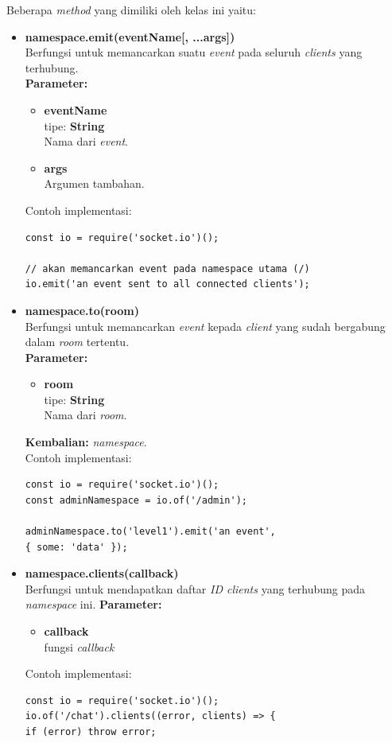 \documentclass[a4paper,twoside]{article}
\begin{document}
\begin{enumerate}
\begin{enumerate}
\begin{enumerate}
				Beberapa \textit{method} yang dimiliki oleh kelas ini yaitu:
				\begin{itemize}
					\item \textbf{namespace.emit(eventName[, ...args])} \\
					Berfungsi untuk memancarkan suatu \textit{event} pada seluruh \textit{clients} yang terhubung. \\
					\textbf{Parameter:}
					\begin{itemize}
						\item \textbf{eventName} \\tipe: \textbf{String} \\ Nama dari \textit{event}.
						\item \textbf{args} \\ Argumen tambahan.
					\end{itemize}
					Contoh implementasi:
\begin{lstlisting}
const io = require('socket.io')();
					
// akan memancarkan event pada namespace utama (/)
io.emit('an event sent to all connected clients'); 
					\end{lstlisting}
					
					\item \textbf{namespace.to(room)} \\ 
					Berfungsi untuk memancarkan \textit{event} kepada \textit{client} yang sudah bergabung dalam \textit{room} tertentu. \\ 
					\textbf{Parameter:}
					\begin{itemize}
						\item \textbf{room} \\tipe: \textbf{String} \\ Nama dari \textit{room}.
					\end{itemize}
					\textbf{Kembalian:} \textit{namespace}. \\
					Contoh implementasi:
\begin{lstlisting}
const io = require('socket.io')();
const adminNamespace = io.of('/admin');
					
adminNamespace.to('level1').emit('an event', 
{ some: 'data' });
\end{lstlisting}
					
					\item \textbf{namespace.clients(callback)} \\
					Berfungsi untuk mendapatkan daftar \textit{ID clients} yang terhubung pada \textit{namespace} ini.
					\textbf{Parameter:}
					\begin{itemize}
						\item \textbf{callback} \\ fungsi \textit{callback}
					\end{itemize}
					Contoh implementasi:
\begin{lstlisting}
const io = require('socket.io')();
io.of('/chat').clients((error, clients) => {
if (error) throw error;
					

\end{lstlisting}
\end{itemize}
\end{enumerate}
\end{enumerate}
\end{enumerate}
\end{document}
